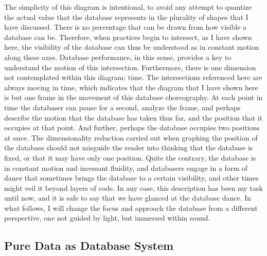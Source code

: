 \documentclass[
]{book}
\begin{document}
The simplicity of this diagram is intentional, to avoid any attempt to quantize the actual value that the database represents in the plurality of shapes that I have discussed. There is no percentage that can be drawn from how visible a database can be. Therefore, when practices begin to intersect, as I have shown here, the visibility of the database can thus be understood as in constant motion along these axes. Database performance, in this sense, provides a key to understand the motion of this intersection. Furthermore, there is one dimension not contemplated within this diagram: time. The intersections referenced here are always moving in time, which indicates that the diagram that I have shown here is but one frame in the movement of this database choreography. At each point in time the databaser can pause for a second, analyze the frame, and perhaps describe the motion that the database has taken thus far, and the position that it occupies at that point. And further, perhaps the database occupies two positions at once. The dimensionality reduction carried out when graphing the position of the database should not misguide the reader into thinking that the database is fixed, or that it may have only one position. Quite the contrary, the database is in constant motion and incessant fluidity, and databasers engage in a form of dance that sometimes brings the database to a certain visibility, and other times might veil it beyond layers of code. In any case, this description has been my task until now, and it is safe to say that we have glanced at the database dance. In what follows, I will change the focus and approach the database from a different perspective, one not guided by light, but immersed within sound.



\subsection{Pure Data as Database System}
\label{model:puredata}
\end{document}
